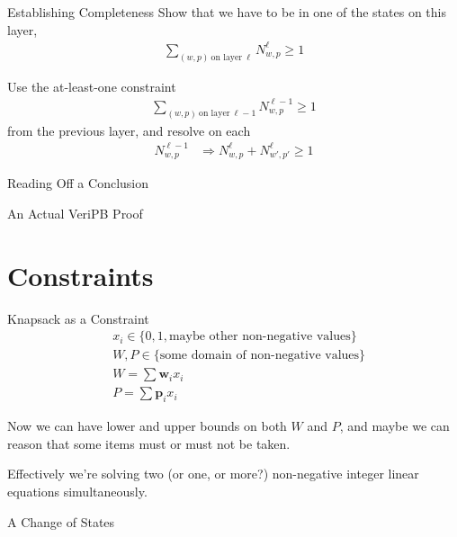 \documentclass[aspectratio=169,compress,10pt]{beamer}
\begin{document}
\begin{frame}{Establishing Completeness}
    Show that we have to be in one of the states on this layer,
    \begin{align*}
        \sum_{(w,p)~\text{on layer}~\ell} N^\ell_{w,p} \ge 1
    \end{align*}

    Use the at-least-one constraint
    \begin{align*}
        \sum_{(w,p)~\text{on layer}~\ell - 1} N^{\ell-1}_{w,p} \ge 1
    \end{align*}
    from the previous layer, and resolve on each \begin{align*}
            N^{\ell-1}_{w,p} &\Rightarrow N^\ell_{w,p} + N^\ell_{w',p'} \ge 1
    \end{align*}
\end{frame}

\begin{frame}{Reading Off a Conclusion}
\end{frame}

\begin{frame}{An Actual VeriPB Proof}
\end{frame}

\section{Constraints}

\begin{frame}{Knapsack as a Constraint}
    \begin{align*}
        &x_i \in \{0, 1, \text{maybe other non-negative values}\}\\
        &W, P \in \{\text{some domain of non-negative values}\}\\
        &W = \sum \boldsymbol{w}_i x_i\\
        &P = \sum \boldsymbol{p}_i x_i
    \end{align*}

    Now we can have lower and upper bounds on both $W$ and $P$, and maybe we can reason that some
    items must or must not be taken.

    \medskip

    Effectively we're solving two (or one, or more?) non-negative integer linear equations simultaneously.
\end{frame}

\begin{frame}{A Change of States}
\end{frame}
\end{document}
